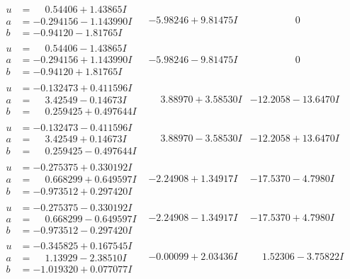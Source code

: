 \documentclass[1p]{elsarticle_modified}
\theoremstyle{definition}
\begin{document}
$$\begin{array}{c|c|c}
\begin{aligned}
u &= \phantom{-}0.54406 + 1.43865 I \\
a &= -0.294156 - 1.143990 I \\
b &= -0.94120 - 1.81765 I\end{aligned}
 & -5.98246 + 9.81475 I & \phantom{-0.000000 } 0 \\ \hline\begin{aligned}
u &= \phantom{-}0.54406 - 1.43865 I \\
a &= -0.294156 + 1.143990 I \\
b &= -0.94120 + 1.81765 I\end{aligned}
 & -5.98246 - 9.81475 I & \phantom{-0.000000 } 0 \\ \hline\begin{aligned}
u &= -0.132473 + 0.411596 I \\
a &= \phantom{-}3.42549 - 0.14673 I \\
b &= \phantom{-}0.259425 + 0.497644 I\end{aligned}
 & \phantom{-}3.88970 + 3.58530 I & -12.2058 - 13.6470 I \\ \hline\begin{aligned}
u &= -0.132473 - 0.411596 I \\
a &= \phantom{-}3.42549 + 0.14673 I \\
b &= \phantom{-}0.259425 - 0.497644 I\end{aligned}
 & \phantom{-}3.88970 - 3.58530 I & -12.2058 + 13.6470 I \\ \hline\begin{aligned}
u &= -0.275375 + 0.330192 I \\
a &= \phantom{-}0.668299 + 0.649597 I \\
b &= -0.973512 + 0.297420 I\end{aligned}
 & -2.24908 + 1.34917 I & -17.5370 - 4.7980 I \\ \hline\begin{aligned}
u &= -0.275375 - 0.330192 I \\
a &= \phantom{-}0.668299 - 0.649597 I \\
b &= -0.973512 - 0.297420 I\end{aligned}
 & -2.24908 - 1.34917 I & -17.5370 + 4.7980 I \\ \hline\begin{aligned}
u &= -0.345825 + 0.167545 I \\
a &= \phantom{-}1.13929 - 2.38510 I \\
b &= -1.019320 + 0.077077 I\end{aligned}
 & -0.00099 + 2.03436 I & \phantom{-}1.52306 - 3.75822 I \\ \hline\begin{aligned}

\end{aligned}
\end{array}$$
\end{document}
